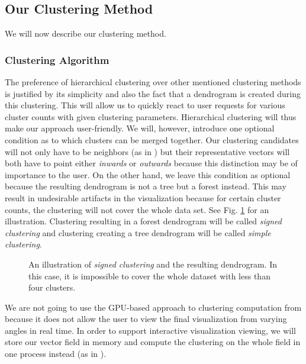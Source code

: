 \subsection{Our Clustering Method}
\label{subsec:analysis-field_clustering-our_method}

We will now describe our clustering method.

\subsubsection{Clustering Algorithm}

The preference of hierarchical clustering over other mentioned clustering methods is justified by its simplicity and also the fact that a dendrogram is created during this clustering. This will allow us to quickly react to user requests for various cluster counts with given clustering parameters. Hierarchical clustering will thus make our approach user-friendly. We will, however, introduce one optional condition as to which clusters can be merged together. Our clustering candidates will not only have to be neighbors (as in \citet{Telea99}) but their representative vectors will both have to point either {\it inwards} or {\it outwards} because this distinction may be of importance to the user. On the other hand, we leave this condition as optional because the resulting dendrogram is not a tree but a forest instead. This may result in undesirable artifacts in the visualization because for certain cluster counts, the clustering will not cover the whole data set. See Fig. \ref{fig:illustration-forest_dendrogram} for an illustration. Clustering resulting in a forest dendrogram will be called {\it signed clustering} and clustering creating a tree dendrogram will be called {\it simple clustering}.

\begin{figure}[h]
\centering
\def\svgwidth{\textwidth}

\caption[Forest Dendrogram]{An illustration of {\it signed clustering} and the resulting dendrogram. In this case, it is impossible to cover the whole dataset with less than four clusters.}
\label{fig:illustration-forest_dendrogram}
\end{figure}

We are not going to use the GPU-based approach to clustering computation from \citet{Peng12} because it does not allow the user to view the final visualization from varying angles in real time. In order to support interactive visualization viewing, we will store our vector field in memory and compute the clustering on the whole field in one process instead (as in \citet{Telea99}).

